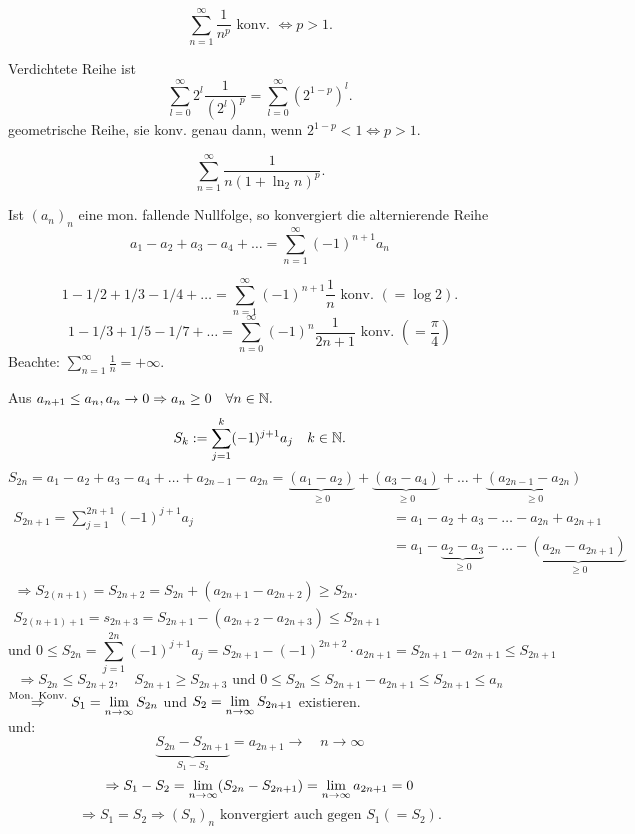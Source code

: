 \documentclass[../ana1.tex]{subfiles}
\begin{document}
\begin{bsp}
	\[ \sum_{n=1}^{\infty} \frac{1}{n^p} \text{ konv. } \Leftrightarrow p>1. \]
\end{bsp}
\begin{bew}
	Verdichtete Reihe ist 
	\[ \sum_{l=0}^{\infty}2^l \frac{1}{(2^l)^p} = \sum_{l=0}^{\infty} (2^{1-p})^l. \]
	geometrische Reihe, sie konv. genau dann, wenn \( 2^{1-p} < 1 \Leftrightarrow p>1. \)
\end{bew}
\begin{bsp}
	\[ \sum_{n=1}^{\infty} \frac{1}{n(1+\ln_2 n )^p}.\]
\end{bsp}
\begin{satz}[Leibniz]
	Ist \( (a_n)_n \) eine mon. fallende Nullfolge, so konvergiert die alternierende Reihe
	\[ a_1 - a_2 + a_3 - a_4 + \dots = \sum_{n=1}^{\infty} (-1)^{n+1} a_n \]
\end{satz}
\begin{bsp}
	\[ 1 - 1/2 + 1/3 - 1/4 + \dots = \sum_{n=1}^{\infty}(-1)^{n+1}\frac{1}{n} \text{ konv. } (=\log 2). \]
	\[ 1 - 1/3 + 1/5 - 1/7 + \dots = \sum_{n=0}^{\infty}(-1)^n \frac{1}{2n+1} \text{ konv. } (=\frac{\pi}{4}) \]
	Beachte: \( \sum_{n=1}^{\infty}\frac{1}{n} = +\infty \).
\end{bsp}
\begin{bew}
	Aus \( a_{n+1} \leq a_n, a_n \rightarrow 0 \Rightarrow a_n \geq 0 \quad\forall n\in\mathbb{N}. \)
	\[ S_k := \sum_{j=1}^{k} (-1)^{j+1} a_j \quad k\in\mathbb{N}. \]
	\[S_{2n} = a_1 - a_2 + a_3 - a_4 + \dots + a_{2n-1} - a_{2n} = \underbrace{(a_1 - a_2)}_{\geq 0} + \underbrace{(a_3 - a_4)}_{\geq 0} + \dots + \underbrace{(a_{2n-1} - a_{2n})}_{\geq 0} \]
	\begin{align*}
		S_{2n+1} = \sum_{j=1}^{2n+1}(-1)^{j+1}a_j &= a_1 - a_2 + a_3 - \dots - a_{2n} + a_{2n+1}\\
		&= a_1 - \underbrace{a_2 - a_3}_{\geq 0} - \dots - \underbrace{(a_{2n} - a_{2n+1})}_{\geq 0}\\
		\Rightarrow S_{2(n+1)} = S_{2n+2} = S_{2n} + (a_{2n+1} - a_{2n+2}) \geq S_{2n}.\\
		S_{2(n+1)+1} = s_{2n+3} = S_{2n+1} - (a_{2n+2} - a_{2n+3}) \leq S_{2n+1}
	\end{align*}
	\[ \text{und } 0 \leq S_{2n} = \sum_{j=1}^{2n} (-1)^{j+1} a_j = S_{2n+1} - (-1)^{2n+2} \cdot a_{2n+1} = S_{2n+1} - a_{2n+1} \leq S_{2n+1}\]
	\[\Rightarrow S_{2n} \leq S_{2n+2}, \quad S_{2n+1} \geq S_{2n+3} \text{ und } 0 \leq S_{2n} \leq S_{2n+1} - a_{2n+1} \leq S_{2n+1} \leq a_n\]
	\( \overset{\text{Mon. Konv.}}{\Rightarrow} S_1 = \lim\limits_{n\rightarrow\infty}S_{2n} \) und \( S_2 = \lim\limits_{n\rightarrow\infty}S_{2n+1} \) existieren.\\	
	und: 
	\[ \underbrace{S_{2n} - S_{2n+1}}_{S_1 - S_2} = a_{2n+1} \rightarrow \quad n\rightarrow \infty \]
	\[ \Rightarrow S_1 - S_2 = \lim\limits_{n\rightarrow\infty}(S_{2n} - S_{2n+1}) = \lim\limits_{n\rightarrow\infty}a_{2n+1} = 0 \]
	\[ \Rightarrow S_1 = S_2 \Rightarrow (S_n)_n \text{ konvergiert auch gegen } S_1 (=S_2). \]
\end{bew}
\end{document}
